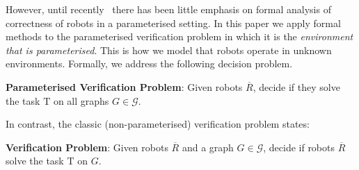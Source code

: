 \documentclass{aamas2015}
\def\gclass{\mathcal{G}}
\def\rclass{\mathcal{R}}
\def\T{\mathrm{T}}
\newcommand{\tup}[1]{\overline{#1}}
\newcommand{\sr}[1]{\footnote{{\color{red} Note. #1}}}
\begin{document}
However, until recently~\cite{KoLo13AAMAS,ABCTU13,MPST14,KoLo15} there has been little emphasis on formal analysis of correctness of robots in a parameterised setting. In this paper we apply formal methods to the parameterised verification problem in which it is the {\em environment that is parameterised}. This is how we model that robots operate in unknown environments. Formally, we address the following decision problem.

{\bf Parameterised Verification Problem}: Given robots $\tup{R}$, decide if they solve the task $\T$ on all graphs $G \in \gclass$.


In contrast, the classic (non-parameterised) verification problem states:

{\bf Verification Problem}: Given robots $\tup{R}$ and a graph $G \in \gclass$, decide if robots $\tup{R}$ solve the task $\T$ on $G$.





\end{document}
